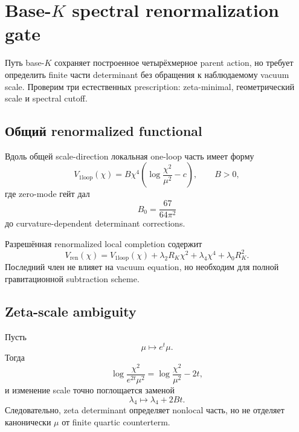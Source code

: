 \chapter{Base-\(K\) spectral renormalization gate}

Путь base-\(K\) сохраняет построенное четырёхмерное parent action, но
требует определить finite части determinant без обращения к наблюдаемому
vacuum scale. Проверим три естественных prescription: zeta-minimal,
геометрический scale и spectral cutoff.

\section{Общий renormalized functional}

Вдоль общей scale-direction локальная one-loop часть имеет форму
\begin{equation}
 V_{\mathrm{1loop}}(\chi)
 =
 B\chi^4
 \left(
 \log\frac{\chi^2}{\mu^2}-c
 \right),
 \qquad
 B>0,
\end{equation}
где zero-mode гейт дал
\begin{equation}
 B_0=\frac{67}{64\pi^2}
\end{equation}
до curvature-dependent determinant corrections.

Разрешённая renormalized local completion содержит
\begin{equation}
 V_{\mathrm{ren}}(\chi)
 =
 V_{\mathrm{1loop}}(\chi)
 +\lambda_2R_K\chi^2
 +\lambda_4\chi^4
 +\lambda_0R_K^2.
\end{equation}
Последний член не влияет на vacuum equation, но необходим для полной
гравитационной subtraction scheme.

\section{Zeta-scale ambiguity}

Пусть
\begin{equation}
 \mu\longmapsto e^t\mu.
\end{equation}
Тогда
\begin{equation}
 \log\frac{\chi^2}{e^{2t}\mu^2}
 =
 \log\frac{\chi^2}{\mu^2}-2t,
\end{equation}
и изменение scale точно поглощается заменой
\begin{equation}
 \lambda_4\longmapsto\lambda_4+2Bt.
\end{equation}
Следовательно, zeta determinant определяет nonlocal часть, но не отделяет
канонически \(\mu\) от finite quartic counterterm.

